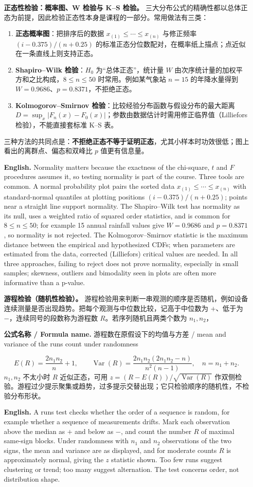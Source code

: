 \documentclass[UTF8,11pt,a4paper]{ctexart}
\newcommand{\EN}[1]{\par\noindent\textbf{English.} #1\par}
\newcommand{\FORMULA}[2]{\par\noindent\textbf{公式名称 / Formula name.} #1 / #2\par}
\begin{document}
\noindent\textbf{正态性检验：概率图、W 检验与 K--S 检验。} 三大分布公式的精确性都以总体正态为前提，因此检验正态性本身是课程的一部分。常用做法有三类：
\begin{enumerate}[label=(\arabic*)]
\item \textbf{正态概率图}：把排序后的数据 $x_{(1)}\le\cdots\le x_{(n)}$ 与修正频率 $(i-0.375)/(n+0.25)$ 的标准正态分位数配对，在概率纸上描点；点近似在一条直线上则支持正态。
\item \textbf{Shapiro--Wilk 检验}：$H_0$ 为“总体正态”，统计量 $W$ 由次序统计量的加权平方和之比构成，$8\le n\le50$ 时常用。例如某气象站 $n=15$ 的年降水量得到 $W=0.9686$、$p=0.8371$，不拒绝正态。
\item \textbf{Kolmogorov--Smirnov 检验}：比较经验分布函数与假设分布的最大距离 $D=\sup_x|F_n(x)-F_0(x)|$；参数由数据估计时需用修正临界值（Lilliefors 检验），不能直接套标准 K--S 表。
\end{enumerate}
三种方法的共同点是：\textbf{不拒绝正态不等于证明正态}，尤其小样本时功效很低；图上看出的离群点、偏态和双峰比 $p$ 值更有信息量。
\EN{Normality matters because the exactness of the chi-square, $t$ and $F$ procedures assumes it, so testing normality is part of the course. Three tools are common. A normal probability plot pairs the sorted data $x_{(1)}\le\cdots\le x_{(n)}$ with standard-normal quantiles at plotting positions $(i-0.375)/(n+0.25)$; points near a straight line support normality. The Shapiro--Wilk test has normality as its null, uses a weighted ratio of squared order statistics, and is common for $8\le n\le50$; for example 15 annual rainfall values give $W=0.9686$ and $p=0.8371$, so normality is not rejected. The Kolmogorov--Smirnov statistic is the maximum distance between the empirical and hypothesized CDFs; when parameters are estimated from the data, corrected (Lilliefors) critical values are needed. In all three approaches, failing to reject does not prove normality, especially in small samples; skewness, outliers and bimodality seen in plots are often more informative than a p-value.}

\noindent\textbf{游程检验（随机性检验）。} 游程检验用来判断一串观测的顺序是否随机，例如设备连续测量是否出现趋势。把每个观测与中位数比较，记高于中位数为 $+$、低于为 $-$，连续同号的段数称为游程数 $R$。若序列随机且两类个数为 $n_1,n_2$，
\FORMULA{游程数在原假设下的均值与方差}{mean and variance of the runs count under randomness}
\[
E(R)=\frac{2n_1n_2}{n}+1,\qquad
\operatorname{Var}(R)=
\frac{2n_1n_2(2n_1n_2-n)}{n^2(n-1)},\quad n=n_1+n_2.
\]
$n_1,n_2$ 不太小时 $R$ 近似正态，可用 $z=(R-E(R))/\sqrt{\operatorname{Var}(R)}$ 作双侧检验。游程过少提示聚集或趋势，过多提示交替出现；它只检验顺序的随机性，不检验分布形状。
\EN{A runs test checks whether the order of a sequence is random, for example whether a sequence of measurements drifts. Mark each observation above the median as $+$ and below as $-$, and count the number $R$ of maximal same-sign blocks. Under randomness with $n_1$ and $n_2$ observations of the two signs, the mean and variance are as displayed, and for moderate counts $R$ is approximately normal, giving the $z$ statistic shown. Too few runs suggest clustering or trend; too many suggest alternation. The test concerns order, not distribution shape.}
\end{document}
